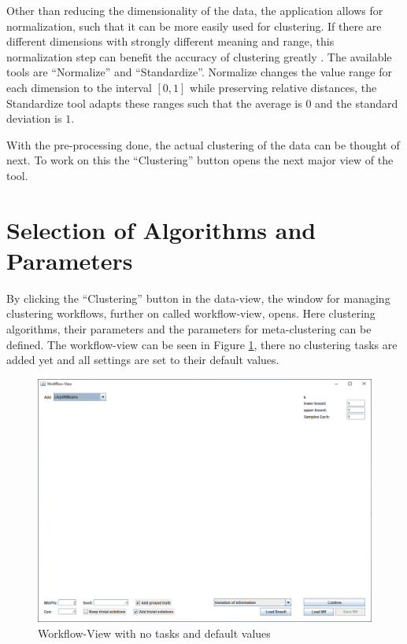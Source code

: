 \documentclass[
	a4paper,
	english,
	twoside,
	openright,               
	11pt                            
	]{report}
\begin{document}
Other than reducing the dimensionality of the data, the application allows for normalization, such that it can be more easily used for clustering. If there are different dimensions with strongly different meaning and range, this normalization step can benefit the accuracy of clustering greatly \cite{normalization}. The available tools are ``Normalize'' and ``Standardize''. Normalize changes the value range for each dimension to the interval $[0,1]$ while preserving relative distances, the Standardize tool adapts these ranges such that the average is $0$ and the standard deviation is $1$.

With the pre-processing done, the actual clustering of the data can be thought of next. To work on this the ``Clustering'' button opens the next major view of the tool.

\section{Selection of Algorithms and Parameters}\label{sec:sel_alg_param}
By clicking the ``Clustering'' button in the data-view, the window for managing clustering workflows, further on called workflow-view, opens. Here clustering algorithms, their parameters and the parameters for meta-clustering can be defined. The workflow-view can be seen in Figure \ref{fig:workflow-view}, there no clustering tasks are added yet and all settings are set to their default values.

\begin{figure}[h]
	\centering
	\includegraphics[scale=.43]{workflow-view}
	\caption{Workflow-View with no tasks and default values}
	\label{fig:workflow-view}
\end{figure}
\end{document}

